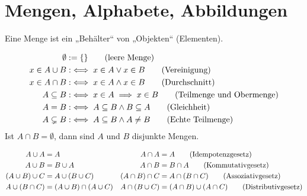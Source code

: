 \chapter{Mengen, Alphabete, Abbildungen}

Eine Menge ist ein „Behälter“ von „Objekten“ (Elementen).

\begin{definition}
  \begin{align*}
    \emptyset &:= \{\} \tag{leere Menge\index{Menge!Leere Menge}} \\
    x \in A \cup B &:\iff x \in A \vee x \in B \tag{Vereinigung\index{Menge!Vereinigung}}\\
    x \in A \cap B &:\iff x \in A \wedge x \in B \tag{Durchschnitt\index{Menge!Durchschnitt}}\\
    A \subseteq B &:\iff x \in A \implies x \in B \tag{Teilmenge und Obermenge\index{Menge!Teilmenge}\index{Menge!Obermenge}}\\
    A = B &:\iff A \subseteq B \wedge B \subseteq A \tag{Gleichheit\index{Menge!Gleichheit}} \\
    A \subsetneq B &:\iff A \subseteq B \wedge A \ne B \tag{Echte Teilmenge\index{Menge!Echte Teilmenge}}
  \end{align*}
  Ist $A \cap B = \emptyset$, dann sind $A$ und $B$ disjunkte Mengen.
  \index[sym]{$\emptyset$}\index[sym]{$\cup$}\index[sym]{$\cap$}\index[sym]{$\subseteq$}\index[sym]{$\subsetneq$}\index[sym]{$=$}
\end{definition}
\begin{lemma}
  \begin{align*}
    A \cup A &= A & A \cap A &= A \tag{Idempotenzgesetz\index{Menge!Idempotenzgesetz}} \\
    A \cup B &= B \cup A & A \cap B &= B \cap A \tag{Kommutativgesetz\index{Menge!Kommutativgesetz}} \\
    (A \cup B) \cup C &= A \cup (B \cup C) & (A \cap B) \cap C &= A \cap (B \cap C) \tag{Assoziativgesetz\index{Menge!Assoziativgesetz}} \\
    A \cup (B \cap C) &= (A \cup B) \cap (A \cup C) & A \cap (B \cup C) &= (A \cap B) \cup (A \cap C) \tag{Distributivgesetz\index{Menge!Distributivgesetz}}
  \end{align*}
\end{lemma}